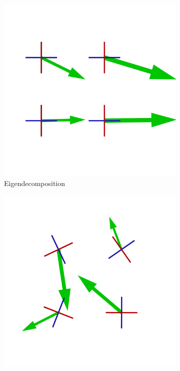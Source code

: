 \begin{figure}
    \begin{subfigure}[b]{0.49\textwidth}
        \includegraphics[width=\textwidth]{Images/sampleEig.png}
        \caption{Eigendecomposition}
        \label{fig:sampleEig}
    \end{subfigure}
    \centering
    \begin{subfigure}[b]{0.49\textwidth}
        \includegraphics[width=\textwidth]{Images/sampleChol.png}

\end{subfigure}
\end{figure}
